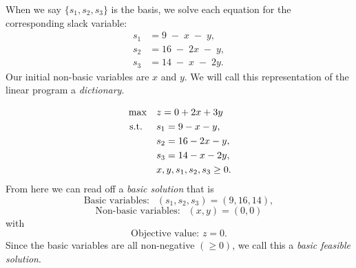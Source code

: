 When we say \(\{s_1,s_2,s_3\}\) is the basis, we solve each equation for the corresponding slack variable:
\[
\begin{aligned}
s_1 &= 9 \;-\; x \;-\; y, \\[6pt]
s_2 &= 16 \;-\; 2x \;-\; y,\\[6pt]
s_3 &= 14 \;-\; x \;-\; 2y.
\end{aligned}
\]
 Our initial non-basic variables are $x$ and $y$. 
We will call this representation of the linear program a \emph{dictionary}. 
\begin{tcolorbox}[colback=blue!5!white, colframe=blue!75!black,     width=0.6\textwidth, %
    box align=center, title=\textbf{Initial Dictionary}]
\[
\begin{aligned}
\max\quad 
& z = 0 + 2x + 3y \\
\text{ s.t. }\quad 
& s_1 = 9 - x - y, \\
& s_2 = 16 - 2x - y, \\
& s_3 = 14 - x - 2y , \\
& x, y, s_1, s_2, s_3 \ge 0.
\end{aligned}
\]
From here we can read off a \emph{basic solution} that is 
$$
\text{Basic variables: } \ \ (s_1, s_2, s_3) = (9, 16,14),$$
$$
 \text{Non-basic variables:  } \ \ (x,y) = (0,0)
$$
with 
$$
\text{Objective value: } z = 0.
$$
Since the basic variables are all non-negative $(\geq 0)$, we call this a \emph{basic feasible solution}.
\end{tcolorbox}

